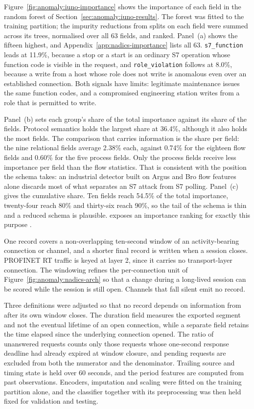 Figure~\ref{fig:anomaly:iuno-importance} shows the importance of each field in the random forest
of Section~\ref{sec:anomaly:iuno-results}. The forest was fitted to the training partition; the
impurity reductions from splits on each field were summed across its trees, normalised over all
63 fields, and ranked. Panel~(a) shows the fifteen highest, and
Appendix~\ref{app:nadics-importance} lists all 63. \texttt{s7\_function} leads at 11.9\%,
because a stop or a start is an ordinary S7 operation whose function code is visible in the
request, and \texttt{role\_violation} follows at 8.0\%, because a write from a host whose
role does not write is anomalous even over an established connection. Both signals have limits:
legitimate maintenance issues the same function codes, and a compromised engineering station
writes from a role that is permitted to write.

Panel~(b) sets each group's share of the total importance against its share of the fields.
Protocol semantics holds the largest share at 36.4\%, although it also holds the most
fields. The comparison that carries information is the share per field: the nine relational
fields average 2.38\% each, against 0.74\% for the eighteen flow fields and 0.60\% for the five
process fields. Only the process fields receive less importance per field than the flow
statistics. That is consistent with the position the schema takes: an
industrial detector built on Argus and Bro flow features alone discards most of what separates an
S7 attack from S7 polling. Panel~(c) gives the cumulative share. Ten fields reach 54.5\%
of the total importance, twenty-four reach 80\% and thirty-six reach 90\%, so the
tail of the schema is thin and a reduced schema is plausible. \nadics{} exposes an importance
ranking for exactly this purpose \cite{iuno_ap4}.

One record covers a non-overlapping ten-second window of an activity-bearing connection or
channel, and a shorter final record is written when a session closes. PROFINET RT traffic is
keyed at layer 2, since it carries no transport-layer connection. The windowing refines the
per-connection unit of Figure~\ref{fig:anomaly:nadics-arch} so that a change during a long-lived
session can be scored while the session is still open. Channels that fall silent emit no record.

Three definitions were adjusted so that no record depends on information from after its own
window closes. The duration field measures the exported segment and not the eventual lifetime of
an open connection, while a separate field retains the time elapsed since the underlying
connection opened. The ratio of unanswered requests counts only those requests whose one-second
response deadline had already expired at window closure, and pending requests are excluded from
both the numerator and the denominator. Trailing source and timing state is held over 60
seconds, and the period features are computed from past observations. Encoders, imputation and
scaling were fitted on the training partition alone, and the classifier together with its
preprocessing was then held fixed for validation and testing.

